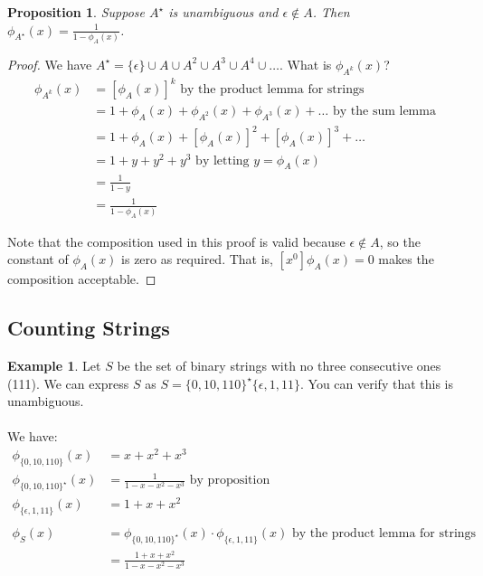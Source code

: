 \documentclass[]{article}
\newtheorem*{proposition}{Proposition}
\theoremstyle{definition}
\newtheorem{ex}{Example}[section]
\newcommand{\lecture}[1]{\marginpar{{\footnotesize $\leftarrow$ \underline{#1}}}}
\begin{document}
			\begin{proposition}
				Suppose $A^\star$ is unambiguous and $\epsilon \not \in A$. Then $\phi_{A^\star}(x) = \frac{1}{1 - \phi_A(x)}$.
				\label{proposition:unambiguousstar}
			\end{proposition}

			\begin{proof}
				We have $A^\star = \{\epsilon\} \cup A \cup A^2 \cup A^3 \cup A^4 \cup \ldots$. What is $\phi_{A^k}(x)$?
				\begin{align*}
					\phi_{A^k}(x) &= [\phi_A(x)]^k \text{ by the product lemma for strings} \\
					&= 1 + \phi_A(x) + \phi_{A^2}(x) + \phi_{A^3}(x) + \ldots \text{ by the sum lemma} \\
					&= 1 + \phi_A(x) + [\phi_A(x)]^2 + [\phi_A(x)]^3 + \ldots \\
					&= 1 + y + y^2 + y^3 \text{ by letting } y = \phi_A(x) \\
					&= \frac{1}{1 - y} \\
					&= \frac{1}{1 - \phi_A(x)}
				\end{align*}

				Note that the composition used in this proof is valid because $\epsilon \not \in A$, so the constant of $\phi_A(x)$ is zero as required. That is, $[x^0]\phi_A(x) = 0$ makes the composition acceptable.
			\end{proof}
		\subsection{Counting Strings} \lecture{January 30, 2013}
			\begin{ex}
				Let $S$ be the set of binary strings with no three consecutive ones (111). We can express $S$ as $S = \{ 0, 10, 110 \}^\star \{\epsilon, 1, 11\}$. You can verify that this is unambiguous.
				\\ \\
				We have:
				\begin{align*}
					\phi_{\{0, 10, 110\}}(x) &= x + x^2 + x^3 \\
					\phi_{\{0, 10, 110\}^\star}(x) &= \frac{1}{1 - x - x^2 - x^3} \text{ by proposition} \\
					\phi_{\{\epsilon, 1, 11\}}(x) &= 1 + x + x^2 \\ \\
					\phi_S(x) &= \phi_{\{0, 10, 110\}^\star}(x) \cdot \phi_{\{\epsilon, 1, 11\}}(x) \text{ by the product lemma for strings} \\
					&= \frac{1 + x + x^2}{1 - x - x^2 - x^3}
				\end{align*}
			\end{ex}
\end{document}
